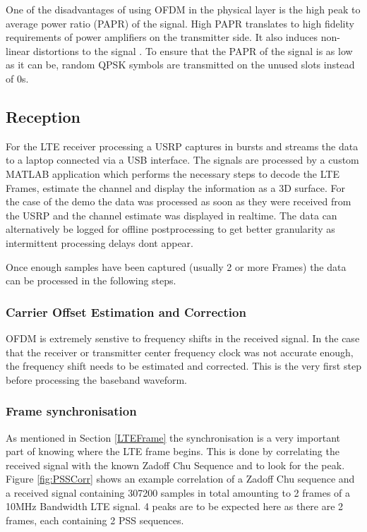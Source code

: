 One of the disadvantages of using OFDM in the physical layer is the high peak to average power ratio (PAPR) of the signal. High PAPR translates to high fidelity requirements of power amplifiers on the transmitter side. It also induces non-linear distortions to the signal \cite{rohling}. To ensure that the PAPR of the signal is as low as it can be, random QPSK symbols are transmitted on the unused slots instead of 0s.



\subsection{Reception}



For the LTE receiver processing a USRP captures in bursts and streams the data to a laptop connected via a USB interface. The signals are processed by a custom MATLAB application which performs the necessary steps to decode the LTE Frames, estimate the channel and display the information as a 3D surface. For the case of the demo the data was processed as soon as they were received from the USRP and the channel estimate was displayed in realtime. The data can alternatively be logged for offline postprocessing to get better granularity as intermittent processing delays dont appear.

Once enough samples have been captured (usually 2 or more Frames) the data can be processed in the following steps.


\subsubsection{Carrier Offset Estimation and Correction}
OFDM is extremely senstive to frequency shifts in the received signal. In the case that the receiver or transmitter center frequency clock was not accurate enough, the frequency shift needs to be estimated and corrected. This is the very first step before processing the baseband waveform.


\subsubsection{Frame synchronisation}
As mentioned in Section \ref{LTEFrame} the synchronisation is a very important part of knowing where the LTE frame begins. This is done by correlating the received signal with the known Zadoff Chu Sequence and to look for the peak. Figure \ref{fig:PSSCorr} shows an example correlation of a Zadoff Chu sequence and a received signal containing 307200 samples in total amounting to 2 frames of a 10MHz Bandwidth LTE signal. 4 peaks are to be expected here as there are 2 frames, each containing 2 PSS sequences.


